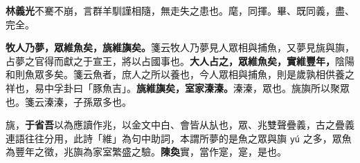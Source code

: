 \begin{quoting}\textbf{林義光}不騫不崩，言群羊馴謹相隨，無走失之患也。麾，同揮。畢、既同義，盡、完全。\end{quoting}

\textbf{牧人乃夢，眾維魚矣，旐維旟矣。}{\footnotesize 箋云牧人乃夢見人眾相與捕魚，又夢見旐與旟，占夢之官得而獻之于宣王，將以占國事也。}\textbf{大人占之，眾維魚矣，實維豐年，}{\footnotesize 陰陽和則魚眾多矣。箋云魚者，庶人之所以養也，今人眾相與捕魚，則是歲孰相供養之祥也，易中孚卦曰「豚魚吉」。}\textbf{旐維旟矣，室家溱溱。}{\footnotesize 溱溱，眾也。旐旟所以聚眾也。箋云溱溱，子孫眾多也。}

\begin{quoting}旐，\textbf{于省吾}以為應讀作兆，以金文中白、會皆从㫃也，眾、兆雙聲疊義，古之疊義連語往往分用，此詩「維」為句中助詞，本謂所夢的是魚之眾與旟 \texttt{yú} 之多，眾魚為豐年之徵，兆旟為家室繁盛之驗。\textbf{陳奐}實，當作寔，寔，是也。\end{quoting}

